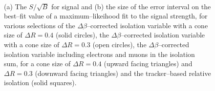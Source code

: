 \begin{figure}[h!]
\begin{center}
~\\
\end{center}
\caption{(a) The $S/\sqrt{B}$ for \Ztautau signal and (b) the size of the error interval on 
the best--fit value of a maximum--likeihood fit to the \Ztautau signal strength,
for various selections of the $\Delta\beta$--corrected
isolation variable with a cone size of $\Delta R = 0.4$ (solid circles), 
the $\Delta\beta$--corrected isolation variable with a cone size of $\Delta R = 0.3$ (open circles),
the $\Delta\beta$--corrected isolation variable including electrons and muons in the isolation
sum, for a cone size of $\Delta R =0.4$ (upward facing triangles) and $\Delta R =0.3$ (downward facing triangles) and
the tracker--based relative isolation (solid squares).}
\label{fig:mssm_selection_mt_muons}
\end{figure}

